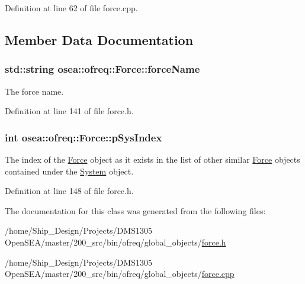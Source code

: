 Definition at line 62 of file force.\-cpp.



\subsection{Member Data Documentation}
\hypertarget{classosea_1_1ofreq_1_1_force_af7cab6c2ebbe013f407570136a5cb8e7}{
\subsubsection[{force\-Name}]{\setlength{\rightskip}{0pt plus 5cm}std\-::string osea\-::ofreq\-::\-Force\-::force\-Name\hspace{0.3cm}{\ttfamily [protected]}}}\label{classosea_1_1ofreq_1_1_force_af7cab6c2ebbe013f407570136a5cb8e7}
The force name. 

Definition at line 141 of file force.\-h.

\hypertarget{classosea_1_1ofreq_1_1_force_ae93d98d3c25ed841450d2a839b936aad}{
\subsubsection[{p\-Sys\-Index}]{\setlength{\rightskip}{0pt plus 5cm}int osea\-::ofreq\-::\-Force\-::p\-Sys\-Index\hspace{0.3cm}{\ttfamily [protected]}}}\label{classosea_1_1ofreq_1_1_force_ae93d98d3c25ed841450d2a839b936aad}


The index of the \hyperlink{classosea_1_1ofreq_1_1_force}{Force} object as it exists in the list of other similar \hyperlink{classosea_1_1ofreq_1_1_force}{Force} objects contained under the \hyperlink{classosea_1_1ofreq_1_1_system}{System} object. 



Definition at line 148 of file force.\-h.



The documentation for this class was generated from the following files\-:\begin{DoxyCompactItemize}
\item 
/home/\-Ship\-\_\-\-Design/\-Projects/\-D\-M\-S1305 Open\-S\-E\-A/master/200\-\_\-src/bin/ofreq/global\-\_\-objects/\hyperlink{force_8h}{force.\-h}\item 
/home/\-Ship\-\_\-\-Design/\-Projects/\-D\-M\-S1305 Open\-S\-E\-A/master/200\-\_\-src/bin/ofreq/global\-\_\-objects/\hyperlink{force_8cpp}{force.\-cpp}\end{DoxyCompactItemize}
